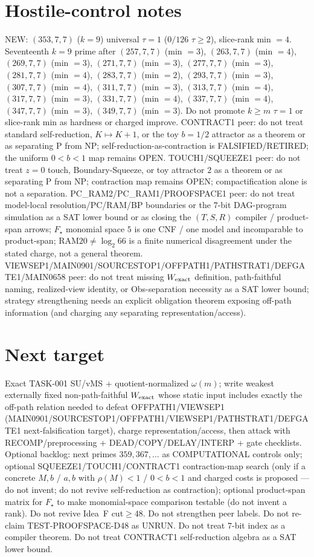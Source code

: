 \documentclass[11pt]{article}
\begin{document}
\section*{Hostile-control notes}
NEW: $(353,7,7)$ ($k{=}9$) universal $\tau{=}1$ ($0/126$ $\tau{\ge}2$), slice-rank min $=4$.
Seventeenth $k{=}9$ prime after $(257,7,7)$ (min $=3$), $(263,7,7)$ (min $=4$), $(269,7,7)$ (min $=3$), $(271,7,7)$ (min $=3$), $(277,7,7)$ (min $=3$), $(281,7,7)$ (min $=4$), $(283,7,7)$ (min $=2$), $(293,7,7)$ (min $=3$), $(307,7,7)$ (min $=4$), $(311,7,7)$ (min $=3$), $(313,7,7)$ (min $=4$), $(317,7,7)$ (min $=3$), $(331,7,7)$ (min $=4$), $(337,7,7)$ (min $=4$), $(347,7,7)$ (min $=3$), $(349,7,7)$ (min $=3$).
Do not promote $k{\ge}m$ $\tau{=}1$ or slice-rank min as hardness or charged improve.
CONTRACT1 peer: do not treat standard self-reduction, $K\mapsto K+1$, or the toy $b{=}1/2$ attractor as a theorem or as separating P from NP;
self-reduction-as-contraction is FALSIFIED/RETIRED; the uniform $0{<}b{<}1$ map remains OPEN.
TOUCH1/SQUEEZE1 peer: do not treat $z{=}0$ touch, Boundary-Squeeze, or toy attractor $2$ as a theorem or as separating P from NP;
contraction map remains OPEN; compactification alone is not a separation.
PC\_RAM2/PC\_RAM1/PROOFSPACE1 peer: do not treat model-local resolution/PC/RAM/BP boundaries or the $7$-bit DAG-program simulation as a SAT lower bound
or as closing the $(T,S,R)$ compiler / product-span arrows; $F_\star$ monomial space $5$ is one CNF / one model and incomparable to product-span;
RAM$20\neq\log_2 66$ is a finite numerical disagreement under the stated charge, not a general theorem.
VIEWSEP1/MAIN0901/SOURCESTOP1/OFFPATH1/PATHSTRAT1/DEFGATE1/MAIN0658 peer: do not treat missing $W_{\rm exact}$ definition,
path-faithful naming, realized-view identity, or Obs-separation necessity as a SAT lower bound;
strategy strengthening needs an explicit obligation theorem exposing off-path information
(and charging any separating representation/access).

\section*{Next target}
Exact TASK-001 SU/vMS + quotient-normalized $\omega(m)$; write weakest externally fixed non-path-faithful
$W_{\rm exact}$ whose static input includes exactly the off-path relation needed to defeat OFFPATH1/VIEWSEP1
(MAIN0901/SOURCESTOP1/OFFPATH1/VIEWSEP1/PATHSTRAT1/DEFGATE1 next-falsification target), charge representation/access,
then attack with RECOMP/preprocessing + DEAD/COPY/DELAY/INTERP + gate checklists.
Optional backlog: next primes $359,367,\ldots$ as COMPUTATIONAL controls only;
optional SQUEEZE1/TOUCH1/CONTRACT1 contraction-map search (only if a concrete $M,b$ / $a,b$ with $\rho(M){<}1$ / $0{<}b{<}1$ and charged costs is proposed --- do not invent; do not revive self-reduction as contraction);
optional product-span matrix for $F_\star$ to make monomial-space comparison testable (do not invent a rank).
Do not revive Idea~F cut$\ge48$. Do not strengthen peer labels.
Do not re-claim TEST-PROOFSPACE-D48 as UNRUN.
Do not treat $7$-bit index as a compiler theorem.
Do not treat CONTRACT1 self-reduction algebra as a SAT lower bound.
\end{document}
